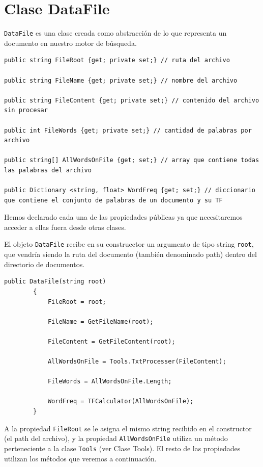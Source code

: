 \documentclass[12pt,a4paper]{report}
\begin{document}
\chapter*{Clase DataFile}
\texttt{DataFile} es una clase creada como abstracción de lo que representa un documento en nuestro motor de búsqueda.

\begin{lstlisting}
public string FileRoot {get; private set;} // ruta del archivo

public string FileName {get; private set;} // nombre del archivo

public string FileContent {get; private set;} // contenido del archivo sin procesar

public int FileWords {get; private set;} // cantidad de palabras por archivo

public string[] AllWordsOnFile {get; set;} // array que contiene todas las palabras del archivo

public Dictionary <string, float> WordFreq {get; set;} // diccionario que contiene el conjunto de palabras de un documento y su TF
\end{lstlisting}

Hemos declarado cada una de las propiedades públicas ya que necesitaremos acceder a ellas fuera desde otras clases. \par\bigskip
El objeto \texttt{DataFile} recibe en su construcctor un argumento de tipo string \texttt{root}, que vendría siendo la ruta del documento (también denominado path) dentro del directorio de documentos.

\begin{lstlisting}
public DataFile(string root)
       	{   
            FileRoot = root;

            FileName = GetFileName(root); 

            FileContent = GetFileContent(root); 
           
            AllWordsOnFile = Tools.TxtProcesser(FileContent);

            FileWords = AllWordsOnFile.Length; 

            WordFreq = TFCalculator(AllWordsOnFile);
        }
\end{lstlisting}

A la propiedad \texttt{FileRoot} se le asigna el mismo string recibido en el constructor (el path del archivo), y la propiedad \texttt{AllWordsOnFile} utiliza un método perteneciente a la clase \texttt{Tools} (ver Clase Tools). El resto de las propiedades utilizan los métodos que veremos a continuación.\par\bigskip
\end{document}
